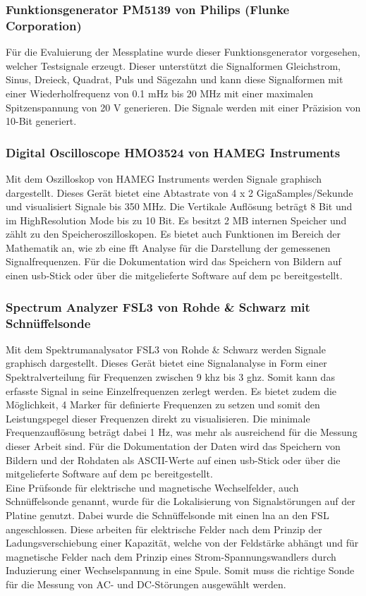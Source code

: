 \subsubsection*{Funktionsgenerator PM5139 von Philips (Flunke Corporation)}\label{sec:funktionsgen}
Für die Evaluierung der Messplatine wurde dieser Funktionsgenerator vorgesehen, welcher Testsignale erzeugt. Dieser unterstützt die Signalformen Gleichstrom, Sinus, Dreieck, Quadrat, Puls und Sägezahn und kann diese Signalformen mit einer Wiederholfrequenz von 0.1 mHz bis 20 MHz mit einer maximalen Spitzenspannung von 20 V generieren. Die Signale werden mit einer Präzision von 10-Bit generiert. \cite{flunkePM5139}

\subsubsection*{Digital Oscilloscope HMO3524 von HAMEG Instruments}\label{sec:oszi}
Mit dem Oszilloskop von HAMEG Instruments werden Signale graphisch dargestellt. Dieses Gerät bietet eine Abtastrate von 4 x 2 GigaSamples/Sekunde und visualisiert Signale bis 350 MHz. Die Vertikale Auflösung beträgt 8 Bit und im HighResolution Mode bis zu 10 Bit. Es besitzt 2 MB internen Speicher und zählt zu den Speicheroszilloskopen. Es bietet auch Funktionen im Bereich der Mathematik an, wie \ac{zb} eine \ac{fft} Analyse für die Darstellung der gemessenen Signalfrequenzen. Für die Dokumentation wird das Speichern von Bildern auf einen \ac{usb}-Stick oder über die mitgelieferte Software auf dem \ac{pc} bereitgestellt. \cite{hamegHMO}

\subsubsection*{Spectrum Analyzer FSL3 von Rohde \& Schwarz mit Schnüffelsonde}\label{sec:analyzer}
Mit dem Spektrumanalysator FSL3 von Rohde \& Schwarz werden Signale graphisch dargestellt. Dieses Gerät bietet eine Signalanalyse in Form einer Spektralverteilung für Frequenzen zwischen 9 \ac{khz} bis 3 \ac{ghz}. Somit kann das erfasste Signal in seine Einzelfrequenzen zerlegt werden. Es bietet zudem die Möglichkeit, 4 Marker für definierte Frequenzen zu setzen und somit den Leistungspegel dieser Frequenzen direkt zu visualisieren. Die minimale Frequenzauflösung beträgt dabei 1 Hz, was mehr als ausreichend für die Messung dieser Arbeit sind. Für die Dokumentation der Daten wird das Speichern von Bildern und der Rohdaten als ASCII-Werte auf einen \ac{usb}-Stick oder über die mitgelieferte Software auf dem \ac{pc} bereitgestellt. \cite{rohdeFSL3}\\
Eine Prüfsonde für elektrische und magnetische Wechselfelder, auch Schnüffelsonde genannt, wurde für die Lokalisierung von Signalstörungen auf der Platine genutzt. Dabei wurde die Schnüffelsonde mit einen \ac{lna} an den FSL angeschlossen. Diese arbeiten für elektrische Felder nach dem Prinzip der Ladungsverschiebung einer Kapazität, welche von der Feldstärke abhängt und für magnetische Felder nach dem Prinzip eines Strom-Spannungswandlers durch Induzierung einer Wechselspannung in eine Spule. Somit muss die richtige Sonde für die Messung von AC- und DC-Störungen ausgewählt werden.

